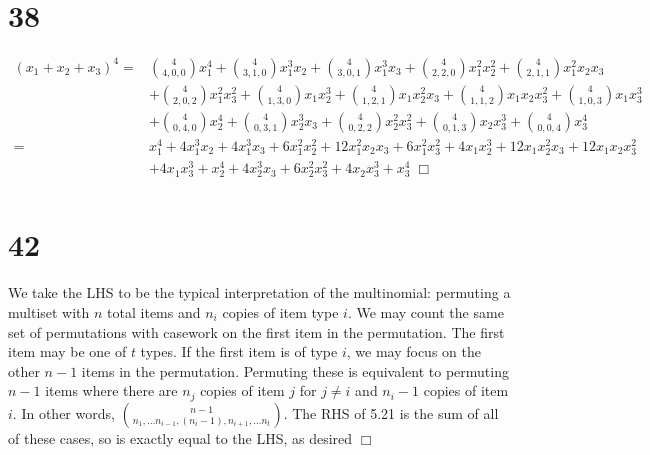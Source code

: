 \documentclass{article}
\begin{document}
\section*{38}
\begin{equation*}
\begin{split}
(x_1 + x_2 + x_3)^4 = & \binom{4}{4,0,0}x_1^4 + \binom{4}{3,1,0}x_1^3x_2 + \binom{4}{3,0,1}x_1^3x_3 + \binom{4}{2,2,0}x_1^2x_2^2 + \binom{4}{2,1,1}x_1^2x_2x_3\\
& + \binom{4}{2,0,2}x_1^2x_3^2 + \binom{4}{1,3,0}x_1x_2^3 + \binom{4}{1,2,1}x_1x_2^2x_3 + \binom{4}{1,1,2}x_1x_2x_3^2 + \binom{4}{1,0,3}x_1x_3^3\\
& + \binom{4}{0,4,0}x_2^4 + \binom{4}{0,3,1}x_2^3x_3 + \binom{4}{0,2,2}x_2^2x_3^2 + \binom{4}{0,1,3}x_2x_3^3 + \binom{4}{0,0,4}x_3^4\\
= & x_1^4 + 4x_1^3x_2 + 4x_1^3x_3 + 6x_1^2x_2^2 + 12x_1^2x_2x_3 + 6x_1^2x_3^2 + 4x_1x_2^3 + 12x_1x_2^2x_3 + 12x_1x_2x_3^2\\
& + 4x_1x_3^3 + x_2^4 + 4x_2^3x_3 + 6x_2^2x_3^2 + 4x_2x_3^3 + x_3^4 \; \Box\\
\end{split}
\end{equation*}

\section*{42}
We take the LHS to be the typical interpretation of the multinomial: permuting a multiset with $n$ total items and $n_i$ copies of item type $i$. We may count the same set of permutations with casework on the first item in the permutation. The first item may be one of $t$ types. If the first item is of type $i$, we may focus on the other $n-1$ items in the permutation. Permuting these is equivalent to permuting $n-1$ items where there are $n_j$ copies of item $j$ for $j \neq i$ and $n_i - 1$ copies of item $i$. In other words, $\binom{n-1}{n_1, \dots n_{i-1}, (n_i - 1), n_{i+1}, \dots n_t}$. The RHS of 5.21 is the sum of all of these cases, so is exactly equal to the LHS, as desired $\Box$
\end{document}
